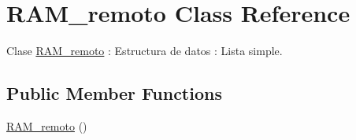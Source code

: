 \hypertarget{classRAM__remoto}{}\section{R\+A\+M\+\_\+remoto Class Reference}
\label{classRAM__remoto}


Clase \hyperlink{classRAM__remoto}{R\+A\+M\+\_\+remoto} \+: Estructura de datos \+: Lista simple.  


\subsection*{Public Member Functions}
\begin{DoxyCompactItemize}
\item 
\hyperlink{classRAM__remoto_a758008409d64084de1c999c2aca46331}{R\+A\+M\+\_\+remoto} ()\hypertarget{classRAM__remoto_a758008409d64084de1c999c2aca46331}{}\label{classRAM__remoto_a758008409d64084de1c999c2aca46331}


\end{DoxyCompactItemize}
